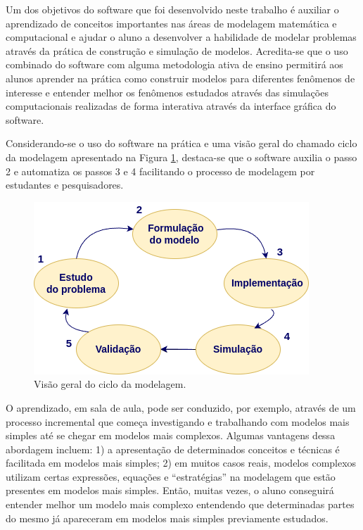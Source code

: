 \documentclass[
	12pt,				%
	openright,			%
	oneside,			%
	a4paper,			%
	main=brazil,
	english,			%
	]{ufsj-abntex2}
\begin{document}
Um dos objetivos do software que foi desenvolvido neste trabalho é auxiliar o aprendizado de conceitos importantes nas áreas de modelagem matemática e computacional e ajudar o aluno a desenvolver a habilidade de modelar problemas através da prática de construção e simulação de modelos. Acredita-se que o uso combinado do software com alguma metodologia ativa de ensino permitirá aos alunos aprender na prática como construir modelos para diferentes fenômenos de interesse e entender melhor os fenômenos estudados através das simulações computacionais realizadas de forma interativa através da interface gráfica do software. 

Considerando-se o uso do software na prática e uma visão geral do chamado ciclo da modelagem apresentado na Figura \ref{fig:ciclo-modelagem}, destaca-se que o software auxilia o passo 2 e automatiza os passos 3 e 4 facilitando o processo de modelagem por estudantes e pesquisadores. 

\begin{figure}[h]
    \centering
    \includegraphics[scale=0.5]{imgs/ciclo-modelagem.png} 
    \caption{Visão geral do ciclo da modelagem.}
    \label{fig:ciclo-modelagem}
\end{figure}

O aprendizado, em sala de aula, pode ser conduzido, por exemplo, através de um processo incremental que começa investigando e trabalhando com modelos mais simples até se chegar em modelos mais complexos. Algumas vantagens dessa abordagem incluem:  1) a apresentação de determinados conceitos e técnicas é facilitada em modelos mais simples; 2) em muitos casos reais, modelos complexos utilizam certas expressões, equações e “estratégias” na modelagem que estão presentes em modelos mais simples. Então, muitas vezes, o aluno conseguirá entender melhor um modelo mais complexo entendendo que determinadas partes do mesmo já apareceram em modelos mais simples previamente estudados. 
\end{document}
